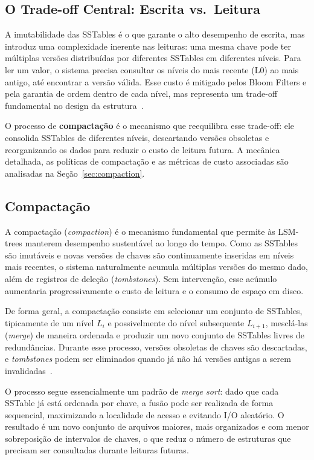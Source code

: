 \subsection*{O Trade-off Central: Escrita vs.\ Leitura}

A imutabilidade das SSTables é o que garante o alto desempenho de escrita, mas
introduz uma complexidade inerente nas leituras: uma mesma chave pode ter múltiplas
versões distribuídas por diferentes SSTables em diferentes níveis. Para ler um
valor, o sistema precisa consultar os níveis do mais recente (L0) ao mais antigo,
até encontrar a versão válida. Esse custo é mitigado pelos Bloom Filters e pela
garantia de ordem dentro de cada nível, mas representa um trade-off fundamental
no design da estrutura~\cite{Sarkar_2021,lsm_survey}.

O processo de \textbf{compactação} é o mecanismo que reequilibra esse trade-off:
ele consolida SSTables de diferentes níveis, descartando versões obsoletas e
reorganizando os dados para reduzir o custo de leitura futura. A mecânica
detalhada, as políticas de compactação e as métricas de custo associadas são
analisadas na Seção~\ref{sec:compaction}.

\subsection*{Compactação}
\label{sec:compaction}

A compactação (\textit{compaction}) é o mecanismo fundamental que permite às
LSM-trees manterem desempenho sustentável ao longo do tempo. Como as SSTables são
imutáveis e novas versões de chaves são continuamente inseridas em níveis mais
recentes, o sistema naturalmente acumula múltiplas versões do mesmo dado,
além de registros de deleção (\textit{tombstones}). Sem intervenção, esse acúmulo
aumentaria progressivamente o custo de leitura e o consumo de espaço em disco.

De forma geral, a compactação consiste em selecionar um conjunto de SSTables,
tipicamente de um nível $L_i$ e possivelmente do nível subsequente $L_{i+1}$,
mesclá-las (\textit{merge}) de maneira ordenada e produzir um novo conjunto de
SSTables livres de redundâncias. Durante esse processo, versões obsoletas de
chaves são descartadas, e \textit{tombstones} podem ser eliminados quando já não
há versões antigas a serem invalidadas~\cite{database_internals,lsm_survey}.

O processo segue essencialmente um padrão de \textit{merge sort}: dado que cada
SSTable já está ordenada por chave, a fusão pode ser realizada de forma sequencial,
maximizando a localidade de acesso e evitando I/O aleatório. O resultado é um
novo conjunto de arquivos maiores, mais organizados e com menor sobreposição de
intervalos de chaves, o que reduz o número de estruturas que precisam ser
consultadas durante leituras futuras.

